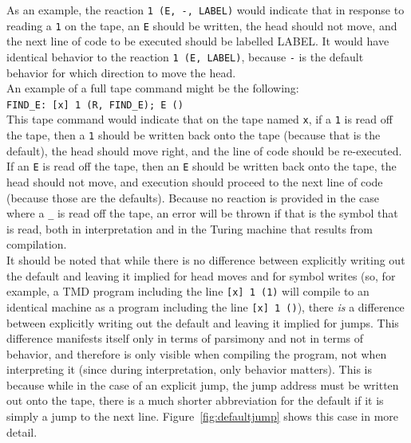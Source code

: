 \documentclass[11pt]{article}
\begin{document}
As an example, the reaction \texttt{1 (E, -, LABEL)} would indicate that in response to reading a \texttt{1} on the tape, an \texttt{E} should be written, the head should not move, and the next line of code to be executed should be labelled LABEL. It would have identical behavior to the reaction \texttt{1 (E, LABEL)}, because \texttt{-} is the default behavior for which direction to move the head. \\

An example of a full tape command might be the following: \\
\texttt{FIND\_E: [x] 1 (R, FIND\_E); E ()} \\

This tape command would indicate that on the tape named \texttt{x}, if a \texttt{1} is read off the tape, then a \texttt{1} should be written back onto the tape (because that is the default), the head should move right, and the line of code should be re-executed. If an \texttt{E} is read off the tape, then an \texttt{E} should be written back onto the tape, the head should not move, and execution should proceed to the next line of code (because those are the defaults). Because no reaction is provided in the case where a \texttt{\_} is read off the tape, an error will be thrown if that is the symbol that is read, both in interpretation and in the Turing machine that results from compilation. \\

It should be noted that while there is no difference between explicitly writing out the default and leaving it implied for head moves and for symbol writes (so, for example, a TMD program including the line \texttt{[x] 1 (1)} will compile to an identical machine as a program including the line \texttt{[x] 1 ()}), there \emph{is} a difference between explicitly writing out the default and leaving it implied for jumps. This difference manifests itself only in terms of parsimony and not in terms of behavior, and therefore is only visible when compiling the program, not when interpreting it (since during interpretation, only behavior matters). This is because while in the case of an explicit jump, the jump address must be written out onto the tape, there is a much shorter abbreviation for the default if it is simply a jump to the next line. Figure~\ref{fig:defaultjump} shows this case in more detail.
\end{document}
